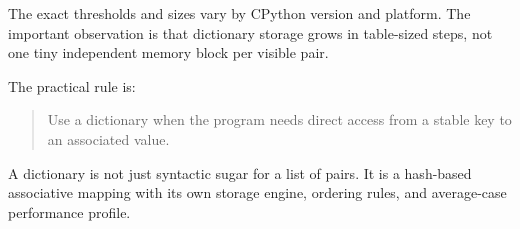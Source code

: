 The exact thresholds and sizes vary by CPython version and platform. The important observation is that dictionary storage grows in table-sized steps, not one tiny independent memory block per visible pair.

The practical rule is:

\begin{quote}
Use a dictionary when the program needs direct access from a stable key to an associated value.
\end{quote}

A dictionary is not just syntactic sugar for a list of pairs. It is a hash-based associative mapping with its own storage engine, ordering rules, and average-case performance profile.